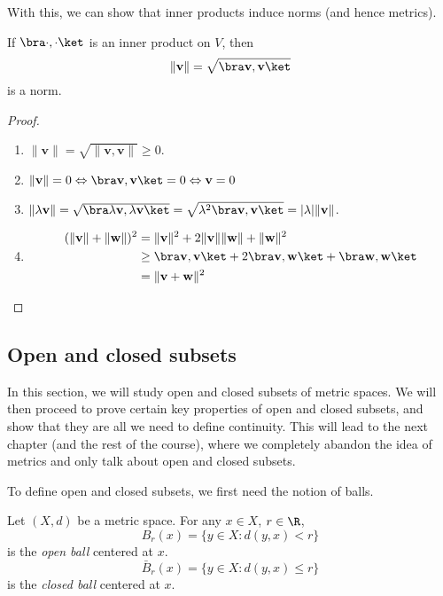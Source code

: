 \documentclass[a4paper]{article}
\begin{document}
With this, we can show that inner products induce norms (and hence metrics).
\begin{lemma}
  If $\bra \cdot, \cdot \ket$ is an inner product on $V$, then
  \[
    \|\mathbf{v}\| = \sqrt{\bra \mathbf{v}, \mathbf{v}\ket}
  \]
  is a norm.
\end{lemma}

\begin{proof}\leavevmode
  \begin{enumerate}
    \item $\|\mathbf{v}\| = \sqrt{\|\mathbf{v}, \mathbf{v}\|} \geq 0$.
    \item $\|\mathbf{v}\| = 0\Leftrightarrow \bra \mathbf{v}, \mathbf{v}\ket = 0 \Leftrightarrow \mathbf{v} = 0$
    \item $\|\lambda \mathbf{v}\| = \sqrt{\bra \lambda \mathbf{v}, \lambda \mathbf{v}\ket} = \sqrt{\lambda^2 \bra \mathbf{v}, \mathbf{v}\ket} = |\lambda| \|\mathbf{v}\|$.
    \item
      \begin{align*}
        (\|\mathbf{v}\| + \|\mathbf{w}\|)^2 &= \|\mathbf{v}\|^2 + 2\|\mathbf{v}\|\|\mathbf{w}\| + \|\mathbf{w}\|^2\\
        &\geq \bra \mathbf{v}, \mathbf{v}\ket + 2\bra \mathbf{v}, \mathbf{w}\ket + \bra \mathbf{w}, \mathbf{w}\ket \\
        &= \|\mathbf{v} + \mathbf{w}\|^2
      \end{align*}
  \end{enumerate}
\end{proof}

\subsection{Open and closed subsets}
In this section, we will study open and closed subsets of metric spaces. We will then proceed to prove certain key properties of open and closed subsets, and show that they are all we need to define continuity. This will lead to the next chapter (and the rest of the course), where we completely abandon the idea of metrics and only talk about open and closed subsets.

To define open and closed subsets, we first need the notion of balls.
\begin{defi}
  Let $(X, d)$ be a metric space. For any $x\in X$, $r\in \R$,
  \[
    B_r(x) = \{y\in X: d(y, x) < r\}
  \]
  is the \emph{open ball} centered at $x$.
  \[
    \bar{B}_r(x) = \{y\in X: d(y, x) \leq r\}
  \]
  is the \emph{closed ball} centered at $x$.
\end{defi}
\end{document}
